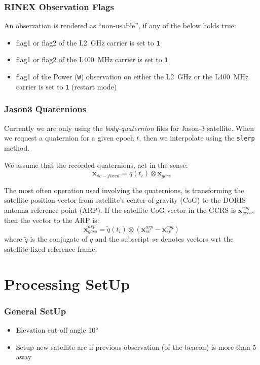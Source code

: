 \subsubsection{RINEX Observation Flags}
\label{sssec:rnx-flags}
An observation is rendered as ``non-usable'', if any of the below holds true:
\begin{itemize}
  \item flag1 or flag2 of the L\SI{2}{\giga\hertz} carrier is set to \texttt{1}
  \item flag1 or flag2 of the L\SI{400}{\mega\hertz} carrier is set to \texttt{1}
  \item flag1 of the Power (\texttt{W}) observation on either the L\SI{2}{\giga\hertz} 
    or the L\SI{400}{\mega\hertz} carrier is set to \texttt{1} (restart mode)
\end{itemize}

\subsubsection{Jason3 Quaternions}
\label{sssec:ja3-quaternions}
Currently we are only using the \emph{body-quaternion} files for Jason-3 
satellite. When we request a quaternion for a given epoch $t$, then we interpolate 
using the \texttt{slerp} method. 

We assume that the recorded quaternions, act in the sense:
\begin{equation}
  \bm{x}_{sv-fixed} = q(t_i) \otimes \bm{x}_{gcrs}
\end{equation}

The most often operation used involving the quaternions, is transforming the 
satellite position vector from satellite's center of gravity (CoG) to the 
DORIS antenna reference point (ARP). If the satellite CoG vector in the GCRS 
is $\bm{x}^{cog}_{gcrs}$, then the vector to the ARP is:
\begin{equation}
  \bm{x}^{arp}_{gcrs} = \tilde{q}(t_i) \otimes (\bm{x}^{arp}_{sv} - \bm{x}^{cog}_{sv})
\end{equation}
where $\tilde{q}$ is the conjugate of $q$ and the subscript $sv$ denotes vectors 
wrt the satellite-fixed reference frame.

\section{Processing SetUp}

\subsubsection{General SetUp}
\begin{itemize}
  \item Elevation cut-off angle \ang{10}
  \item Setup new satellite arc if previous observation (of the beacon) is more 
    than \SI{5}{\min} away
\end{itemize}

